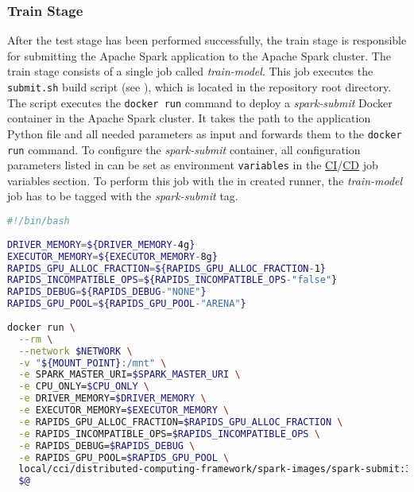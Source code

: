 \subsubsection{Train Stage}
After the test stage has been performed successfully, the train stage is responsible for submitting the Apache Spark application to the Apache Spark cluster.
The train stage consists of a single job called \textit{train-model}.
This job executes the \texttt{submit.sh} build script (see ), which is located in the repository root directory. The script executes the \texttt{docker run} command to deploy a \textit{spark-submit} Docker container in the Apache Spark cluster. It takes the path to the application Python file and all needed parameters as input and forwards them to the \texttt{docker run} command.
To configure the \textit{spark-submit} container, all configuration parameters listed in  can be set as environment \texttt{variables} in the \hyperlink{abbr:ci}{CI}/\hyperlink{abbr:cd}{CD} job variables section.
To perform this job with the in  created runner, the \textit{train-model} job has to be tagged with the \textit{spark-submit} tag.
%
\begin{lstlisting}[label=lst:06_ci_pipeline_submit, caption=Submit script to execute \texttt{docker run} with all needed configuration parameters, language=bash]
#!/bin/bash
 
DRIVER_MEMORY=${DRIVER_MEMORY-4g}
EXECUTOR_MEMORY=${EXECUTOR_MEMORY-8g}
RAPIDS_GPU_ALLOC_FRACTION=${RAPIDS_GPU_ALLOC_FRACTION-1}
RAPIDS_INCOMPATIBLE_OPS=${RAPIDS_INCOMPATIBLE_OPS-"false"}
RAPIDS_DEBUG=${RAPIDS_DEBUG-"NONE"}
RAPIDS_GPU_POOL=${RAPIDS_GPU_POOL-"ARENA"}
 
docker run \
  --rm \
  --network $NETWORK \
  -v "${MOUNT_POINT}:/mnt" \
  -e SPARK_MASTER_URI=$SPARK_MASTER_URI \
  -e CPU_ONLY=$CPU_ONLY \
  -e DRIVER_MEMORY=$DRIVER_MEMORY \
  -e EXECUTOR_MEMORY=$EXECUTOR_MEMORY \
  -e RAPIDS_GPU_ALLOC_FRACTION=$RAPIDS_GPU_ALLOC_FRACTION \
  -e RAPIDS_INCOMPATIBLE_OPS=$RAPIDS_INCOMPATIBLE_OPS \
  -e RAPIDS_DEBUG=$RAPIDS_DEBUG \
  -e RAPIDS_GPU_POOL=$RAPIDS_GPU_POOL \
  local/cci/distributed-computing-framework/spark-images/spark-submit:3.0.1-hadoop2.7 \
  $@
\end{lstlisting}


